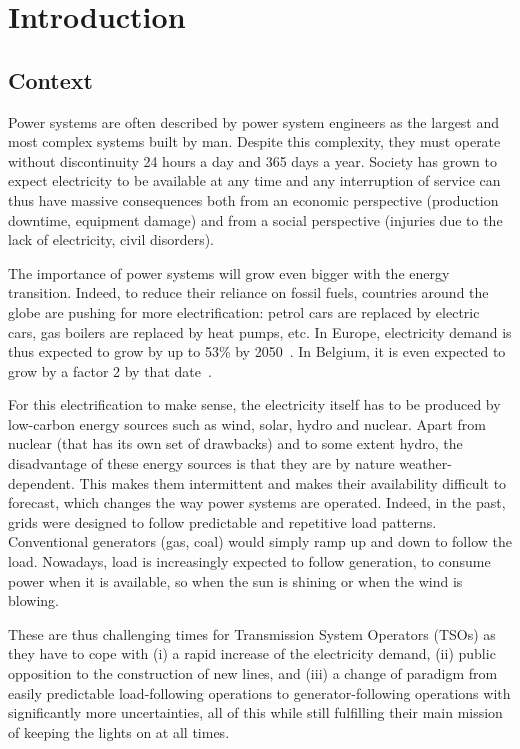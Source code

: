 \chapter{Introduction}
\section{Context}

Power systems are often described by power system engineers as the largest and most complex systems built by man. Despite this complexity, they must operate without discontinuity 24 hours a day and 365 days a year. Society has grown to expect electricity to be available at any time and any interruption of service can thus have massive consequences both from an economic perspective (production downtime, equipment damage) and from a social perspective (injuries due to the lack of electricity, civil disorders).

The importance of power systems will grow even bigger with the energy transition. Indeed, to reduce their reliance on fossil fuels, countries around the globe are pushing for more electrification: petrol cars are replaced by electric cars, gas boilers are replaced by heat pumps, etc. In Europe, electricity demand is thus expected to grow by up to 53\% by 2050~\cite{ENTSOE-TYNDP2024}. In Belgium, it is even expected to grow by a factor 2 by that date~\cite{Elia-Blueprint2050}.

For this electrification to make sense, the electricity itself has to be produced by low-carbon energy sources such as wind, solar, hydro and nuclear. Apart from nuclear (that has its own set of drawbacks) and to some extent hydro, the disadvantage of these energy sources is that they are by nature weather-dependent. This makes them intermittent and makes their availability difficult to forecast, which changes the way power systems are operated. Indeed, in the past, grids were designed to follow predictable and repetitive load patterns. Conventional generators (gas, coal) would simply ramp up and down to follow the load. Nowadays, load is increasingly expected to follow generation, \ie to consume power when it is available, so when the sun is shining or when the wind is blowing.

These are thus challenging times for Transmission System Operators (TSOs) as they have to cope with (i) a rapid increase of the electricity demand, (ii) public opposition to the construction of new lines, and (iii) a change of paradigm from easily predictable load-following operations to generator-following operations with significantly more uncertainties, all of this while still fulfilling their main mission of keeping the lights on at all times.

